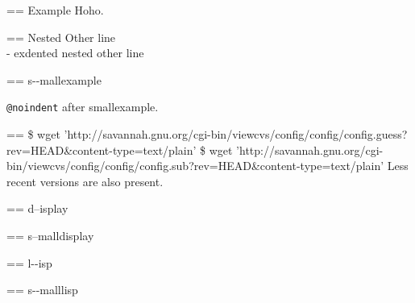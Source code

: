 \documentclass{book}
\makeatletter
\newenvironment{GNUTexinfopreformatted}{%
  \par\GNUTobeylines\obeyspaces\frenchspacing
  \parskip=\z@\parindent=\z@}{}
{\catcode`\^^M=13 \gdef\GNUTobeylines{\catcode`\^^M=13 \def^^M{\null\par}}}
\newenvironment{GNUTexinfoindented}
  {\begin{list}{}{}
  \item\relax}
  {\end{list}}
\makeatother
\begin{document}
\begin{GNUTexinfoindented}
\begin{GNUTexinfopreformatted}%
\ttfamily Example   Hoho.
\end{GNUTexinfopreformatted}
\begin{GNUTexinfoindented}
\begin{GNUTexinfopreformatted}%
\ttfamily Nested Other line
\end{GNUTexinfopreformatted}
\leavevmode{}\\
\hbox{\kern -\leftmargin}%
exdented nested other line
\\
\end{GNUTexinfoindented}
\end{GNUTexinfoindented}

\begin{GNUTexinfopreformatted}%
\ttfamily \footnotesize s{-}{-}mallexample
\end{GNUTexinfopreformatted}

\texttt{@noindent} after smallexample.
\begin{GNUTexinfopreformatted}%
\ttfamily \footnotesize \$ wget 'http://savannah.gnu.org/cgi-bin/viewcvs/config/config/config.guess?rev=HEAD\&content-type=text/plain'
\$ wget 'http://savannah.gnu.org/cgi-bin/viewcvs/config/config/config.sub?rev=HEAD\&content-type=text/plain'
\end{GNUTexinfopreformatted}
\noindent{}Less recent versions are also present.

\begin{GNUTexinfoindented}
\begin{GNUTexinfopreformatted}%
d--isplay
\end{GNUTexinfopreformatted}
\end{GNUTexinfoindented}

\begin{GNUTexinfopreformatted}%
\footnotesize s--malldisplay
\end{GNUTexinfopreformatted}

\begin{GNUTexinfoindented}
\begin{GNUTexinfopreformatted}%
\ttfamily l{-}{-}isp
\end{GNUTexinfopreformatted}
\end{GNUTexinfoindented}

\begin{GNUTexinfopreformatted}%
\ttfamily \footnotesize s{-}{-}malllisp
\end{GNUTexinfopreformatted}
\end{document}
